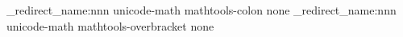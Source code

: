 \newcommand{\thesisboldmath}{\bm} %
\ifthesisotfmath
\ExplSyntaxOn
\msg_redirect_name:nnn { unicode-math } { mathtools-colon } { none }
\msg_redirect_name:nnn { unicode-math } { mathtools-overbracket } { none }
\ExplSyntaxOff
\fi
\ifthesismathtime
\edef\thesis@tmp{\noexpand\RequirePackage[ntxcal, textsf, scale=\thesis@fontscale]{mtpro2-otf}}\thesis@tmp
\else\ifthesisntxotf
